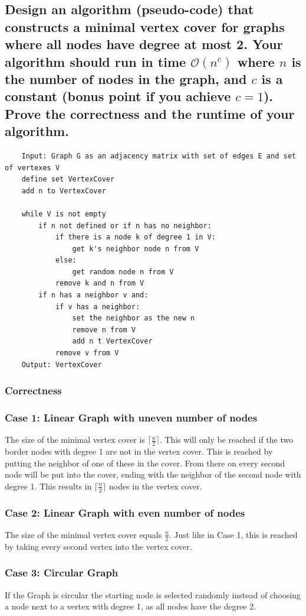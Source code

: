 \documentclass[runningheads]{llncs}
\begin{document}
\newpage
\subsection*{Design an algorithm (pseudo-code) that constructs a minimal vertex cover for graphs where all nodes have degree at most 2. Your algorithm should run in time $\mathcal{O}(n^c)$ where $n$ is the number of nodes in the graph, and $c$ is a constant (bonus point if you achieve $c = 1$). Prove the correctness and the runtime of your algorithm.}
\begin{verbatim}
    Input: Graph G as an adjacency matrix with set of edges E and set of vertexes V
    define set VertexCover
    add n to VertexCover

    while V is not empty
        if n not defined or if n has no neighbor:
            if there is a node k of degree 1 in V:
                get k's neighbor node n from V
            else:
                get random node n from V
            remove k and n from V
        if n has a neighbor v and:
            if v has a neighbor:
                set the neighbor as the new n
                remove n from V
                add n t VertexCover
            remove v from V
    Output: VertexCover
\end{verbatim}

\subsubsection*{Correctness}
\subsubsection*{Case 1: Linear Graph with uneven number of nodes} The size of the minimal vertex cover is $\lceil\frac{n}{2}\rceil$. This will only be reached if
the two border nodes with degree 1 are not in the vertex cover. This is reached by putting the neighbor of one of these in the cover. From there on every second node
will be put into the cover, ending with the neighbor of the second node with degree 1. This results in $\lceil\frac{n}{2}\rceil$ nodes in the vertex cover.
\subsubsection*{Case 2: Linear Graph with even number of nodes} The size of the minimal vertex cover equals $\frac{n}{2}$. Just like in Case 1, this is reached by taking
every second vertex into the vertex cover.
\subsubsection*{Case 3: Circular Graph} If the Graph is circular the starting node is selected randomly instead of choosing a node next to a vertex with degree 1, as all nodes have the degree 2.
\end{document}
